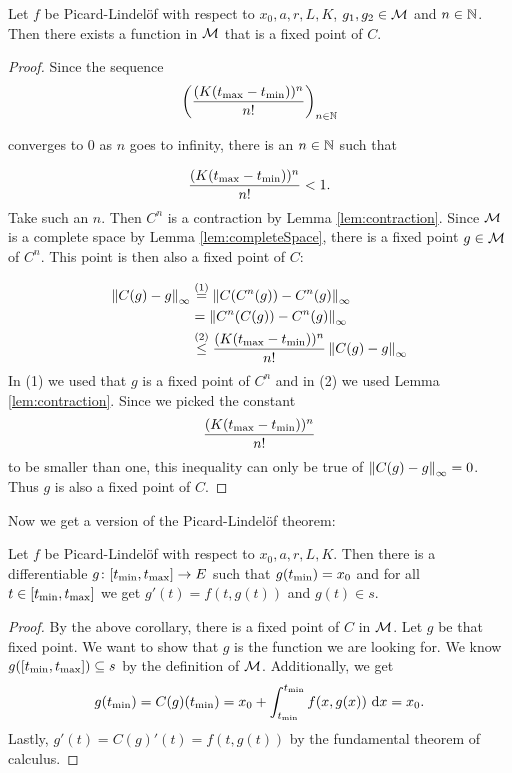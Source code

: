 \begin{cor}
Let $f$ be Picard-Lindelöf with respect to $x_0, a, r, L, K$, $g_1, g_2 \in \mathcal{M}$ and $n \in \mathbb{N}$.
Then there exists a function in $\mathcal{M}$ that is a fixed point of $C$.
\end{cor}
\begin{proof}
Since the sequence 
\begin{equation*}
    \left(\frac{(K(t_{\text{max}} - t_{\text{min}}))^n}{n!}\right)_{n \in \mathbb{N}}
\end{equation*}

converges to $0$ as $n$ goes to infinity, there is an $n \in \mathbb{N}$ such that 

\begin{equation*}
    \frac{(K(t_{\text{max}} - t_{\text{min}}))^n}{n!} < 1.
\end{equation*}
Take such an $n$. 
Then $C^n$ is a contraction by Lemma \ref{lem:contraction}. 
Since $\mathcal{M}$ is a complete space by Lemma \ref{lem:completeSpace}, there is a fixed point $g \in \mathcal{M}$ of $C^n$. This point is then also a fixed point of $C$: 

\begin{equation*}
    \begin{split}
        \left\lVert C(g) - g\right\rVert_\infty &\stackrel{(1)}{=} \left\lVert C (C^n(g)) - C^n(g)\right\rVert_\infty \\
        &= \left\lVert C^n(C(g)) - C^n(g)\right\rVert_\infty \\
        &\stackrel{(2)}{\le} \frac{(K(t_{\text{max}} - t_{\text{min}}))^n}{n!}\left\lVert C(g) - g\right\rVert_\infty
    \end{split}
\end{equation*}
In (1) we used that $g$ is a fixed point of $C^n$ and in (2) we used Lemma \ref{lem:contraction}. 
Since we picked the constant 
\begin{equation*}
    \frac{(K(t_{\text{max}} - t_{\text{min}}))^n}{n!}
\end{equation*}
to be smaller than one, this inequality can only be true of $\left\lVert C(g) - g\right\rVert_\infty = 0$. 
Thus $g$ is also a fixed point of $C$.
\end{proof}

Now we get a version of the Picard-Lindelöf theorem: 

\begin{lem}
Let $f$ be Picard-Lindelöf with respect to $x_0, a, r, L, K$. 
Then there is a differentiable $g \colon [t_{\text{min}}, t_{\text{max}}] \to E$ such that $g (t_{\text{min}}) = x_0$ and for all $t \in [t_{\text{min}}, t_{\text{max}}]$ we get $g'(t) = f(t, g(t))$ and $g(t) \in s$. 
\end{lem}
\begin{proof}
By the above corollary, there is a fixed point of $C$ in $\mathcal{M}$. 
Let $g$ be that fixed point. 
We want to show that $g$ is the function we are looking for. 
We know $g ([t_{\text{min}}, t_{\text{max}}]) \subseteq s$ by the definition of $\mathcal{M}$. 
Additionally, we get 
\begin{equation*}
    g(t_{\text{min}}) = C(g)(t_{\text{min}}) = x_0 + \int_{t_{\text{min}}}^{t_{\text{min}}} f(x, g(x)) \mathop{}\mathrm{d} x = x_0.
\end{equation*}
Lastly,  $g'(t) = C(g)'(t) = f(t, g(t))$ by the fundamental theorem of calculus. 
\end{proof}

